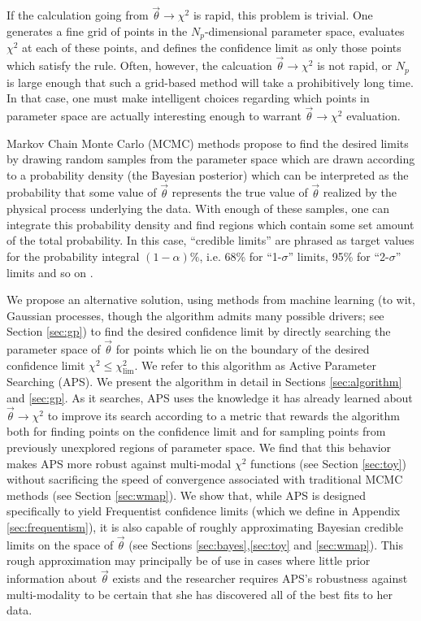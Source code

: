 \documentclass[useAMS,usenatbib]{aastex}
\begin{document}
If the calculation going from $\vec{\theta}\rightarrow\chi^2$ is rapid, this
problem is trivial.  One generates a fine grid of points in the 
$N_p$-dimensional parameter space, evaluates $\chi^2$ at each of these points, 
and defines the confidence limit as only those points which satisfy the rule.  
Often, however, the calcuation $\vec{\theta}\rightarrow\chi^2$ is not rapid, or $N_p$
is large enough that such a grid-based method will take a prohibitively long
time.  In that case, one must make intelligent choices regarding which points in
parameter space are actually interesting enough to warrant
 $\vec{\theta}\rightarrow\chi^2$ evaluation.

Markov Chain Monte Carlo (MCMC) methods propose to find the desired
limits by drawing random samples from the parameter space which are drawn
according to a probability density (the Bayesian posterior) which can be
interpreted as the probability that some value of $\vec{\theta}$ represents the
true value of $\vec{\theta}$ realized by the physical process underlying
the data.  
With enough of these samples, one can integrate this
probability density and find regions which contain some set amount of the total
probability.  In this case, ``credible limits'' are phrased as target values
for the probability integral $(1-\alpha)\%$, i.e. 
68\% for ``1-$\sigma$'' limits, 95\% for ``2-$\sigma$'' limits
and so on \cite{mcmc}.

We propose an alternative solution, using methods from machine learning
(to wit, Gaussian processes, though the algorithm admits many possible drivers; see
Section \ref{sec:gp})
to find the desired confidence limit by directly searching the
parameter space of $\vec{\theta}$ for points which lie on the boundary of the
desired confidence limit $\chi^2\le\chi^2_\text{lim}$.  
We refer to this algorithm as Active Parameter Searching (APS).
We present the algorithm in detail in Sections \ref{sec:algorithm} and
\ref{sec:gp}.
As it searches, APS uses
the knowledge it has already learned about $\vec{\theta}\rightarrow\chi^2$ 
to improve its search according to a metric that rewards the
algorithm both for finding points on the confidence limit and for sampling
points from previously unexplored regions of parameter space.  We find that this
behavior makes APS more robust against multi-modal $\chi^2$ functions (see
Section \ref{sec:toy}) without
sacrificing the speed of convergence 
associated with traditional MCMC methods (see Section \ref{sec:wmap}).
We show that, while APS is designed specifically to
yield Frequentist confidence
limits (which we define in Appendix \ref{sec:frequentism}),
it is also capable of roughly approximating
Bayesian credible limits on the space of
$\vec{\theta}$ (see Sections \ref{sec:bayes},\ref{sec:toy} and \ref{sec:wmap}).
This rough approximation may principally be of use in cases where little 
prior information about $\vec{\theta}$ exists and the researcher
requires APS's robustness against multi-modality to be certain that she
has discovered all of the best fits to her data.
\end{document}
